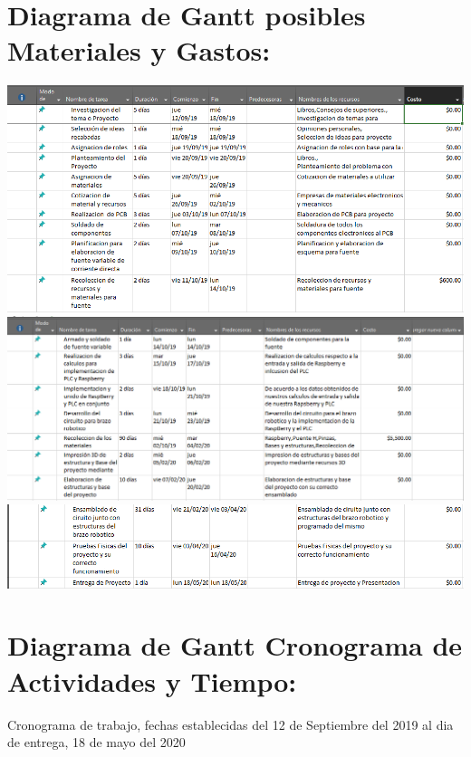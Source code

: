 \documentclass[14pt,a4paper]{article}
\begin{document}
\section{Diagrama de Gantt posibles Materiales y Gastos:}

\begin{center}
\includegraphics[width=15cm]{DefinicionTareas/4.png} 
\includegraphics[width=15cm]{DefinicionTareas/5.png} 
\includegraphics[width=15cm]{DefinicionTareas/6.png} 
\end{center}

\section{Diagrama de Gantt Cronograma de Actividades y Tiempo:}
Cronograma de trabajo, fechas establecidas del 12 de  Septiembre del 2019 al dia de entrega, 18 de mayo del 2020
\end{document}
